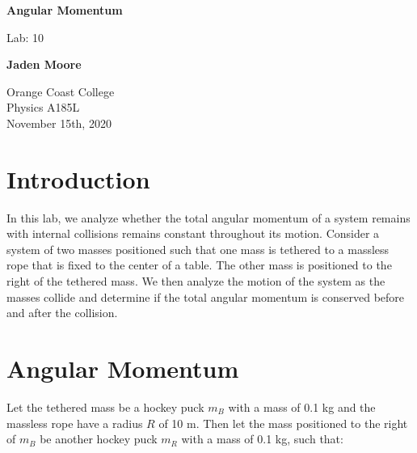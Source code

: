 \documentclass[12pt]{article}
\begin{document}

\begin{titlepage}
    \begin{center}
        \vspace*{1cm}
        \textbf{Angular Momentum}

        \vspace{0.5cm}
        Lab: 10

        \vspace{1cm}

        \textbf{Jaden Moore}

        \vfill

        Orange Coast College\\
        Physics A185L\\
        November 15th, 2020

    \end{center}
\end{titlepage}

\pagestyle{fancy}
\fancyhf{}
\setlength{\headheight}{15pt}
\cfoot{\thepage}

\section{Introduction}
In this lab, we analyze whether the total angular momentum of a system remains with internal collisions remains constant throughout its motion. Consider a system of two masses positioned such that one mass is tethered to a massless rope that is fixed to the center of a table. The other mass is positioned to the right of the tethered mass. We then analyze the motion of the system as the masses collide and determine if the total angular momentum is conserved before and after the collision.

\section{Angular Momentum}
Let the tethered mass be a hockey puck $m_B$ with a mass of 0.1 kg and the massless rope have a radius $R$ of 10 m. Then let the mass positioned to the right of $m_B$ be another hockey puck $m_R$ with a mass of 0.1 kg, such that:
\end{document}
